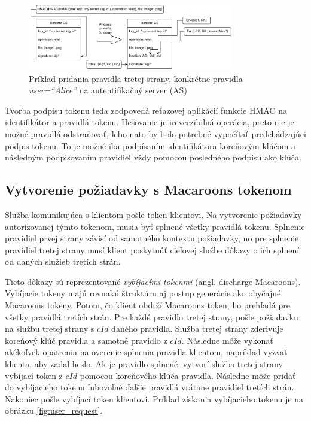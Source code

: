 \begin{figure}
    \centerline{\includegraphics[width=0.8\textwidth]{images/3rd_party_caveat}}
    \caption[Pridanie pravidla tretej strany]{Príklad pridania pravidla tretej strany, konkrétne pravidla \textit{user=``Alice''} na autentifikačný server (AS)}
    \label{fig:add_caveat}
\end{figure}

Tvorba podpisu tokenu teda zodpovedá reťazovej aplikácií funkcie HMAC na identifikátor a pravidlá tokenu. Hešovanie je ireverzibilná operácia, preto nie je možné pravidlá odstraňovať, lebo nato by bolo potrebné vypočítať predchádzajúci podpis tokenu. To je možné iba podpísaním identifikátora koreňovým kľúčom a následným podpisovaním pravidiel vždy pomocou posledného podpisu ako kľúča.

\subsection{Vytvorenie požiadavky s Macaroons tokenom}

Služba komunikujúca s klientom pošle token klientovi. Na vytvorenie požiadavky autorizovanej týmto tokenom, musia byť splnené všetky pravidlá tokenu. Splnenie pravidiel prvej strany závisí od samotného kontextu požiadavky, no pre splnenie pravidiel tretej strany musí klient poskytnúť cieľovej službe dôkazy o ich splnení od daných služieb tretích strán.

Tieto dôkazy sú reprezentované \textit{vybíjacími tokenmi} (angl. discharge Macaroons). Vybíjacie tokeny majú rovnakú štruktúru aj postup generácie ako obyčajné Macaroons tokeny. Potom, čo klient obdrží Macaroons token, ho prehľadá pre všetky pravidlá tretích strán. Pre každé pravidlo tretej strany, pošle požiadavku na službu tretej strany s $cId$ daného pravidla. Služba tretej strany zderivuje koreňový kľúč pravidla a samotné pravidlo z $cId$. Následne môže vykonať akékoľvek opatrenia na overenie splnenia pravidla klientom, napríklad vyzvať klienta, aby zadal heslo. Ak je pravidlo splnené, vytvorí služba tretej strany vybíjací token z $cId$ pomocou koreňového kľúča pravidla. Následne môže pridať do vybíjacieho tokenu ľubovoľné ďalšie pravidlá vrátane pravidiel tretích strán. Nakoniec pošle vybíjací token klientovi. Príklad získania vybíjacieho tokenu je na obrázku \ref{fig:user_request}.

